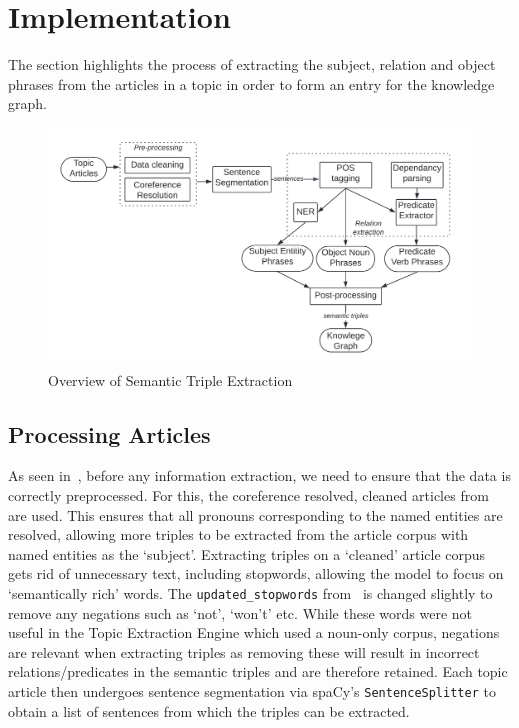 \section{Implementation}

The section highlights the process of extracting the subject, relation and object phrases from the articles in a topic in order to form an entry for the knowledge graph. 

\begin{figure}[H]
  \centering
  \includegraphics[scale=0.17]{images/ste_imp.png}
  \vspace{-2ex}
  \caption{Overview of Semantic Triple Extraction}
  \label{fig:rel_overview}
\end{figure}

\subsection{Processing Articles}
As seen in~, before any information extraction, we need to ensure that the data is correctly preprocessed. For this, the coreference resolved, cleaned articles from~ are used. This ensures that all pronouns corresponding to the named entities are resolved, allowing more triples to be extracted from the article corpus with named entities as the `subject'. Extracting triples on a `cleaned' article corpus gets rid of unnecessary text, including stopwords, allowing the model to focus on `semantically rich' words. The \texttt{updated\_stopwords} from~ is changed slightly to remove any negations such as `not', `won't' etc. While these words were not useful in the Topic Extraction Engine which used a noun-only corpus, negations are relevant when extracting triples as removing these will result in incorrect relations/predicates in the semantic triples and are therefore retained. Each topic article then undergoes sentence segmentation via spaCy's \texttt{SentenceSplitter} to obtain a list of sentences from which the triples can be extracted.

